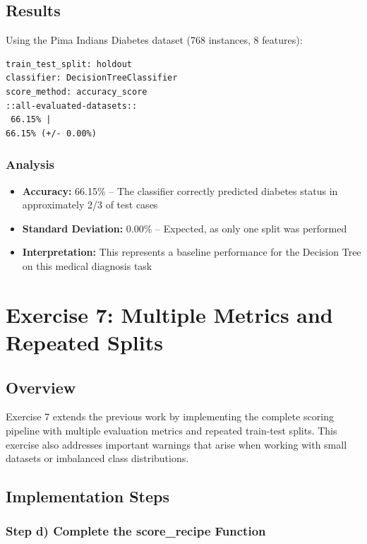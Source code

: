 \documentclass[12pt,a4paper]{article}
\begin{document}
\subsection{Results}

Using the Pima Indians Diabetes dataset (768 instances, 8 features):

\begin{verbatim}
train_test_split: holdout
classifier: DecisionTreeClassifier
score_method: accuracy_score
::all-evaluated-datasets::
 66.15% |
66.15% (+/- 0.00%)
\end{verbatim}

\subsubsection{Analysis}

\begin{itemize}
    \item \textbf{Accuracy:} 66.15\% -- The classifier correctly predicted diabetes status in approximately 2/3 of test cases
    \item \textbf{Standard Deviation:} 0.00\% -- Expected, as only one split was performed
    \item \textbf{Interpretation:} This represents a baseline performance for the Decision Tree on this medical diagnosis task
\end{itemize}

\section{Exercise 7: Multiple Metrics and Repeated Splits}

\subsection{Overview}

Exercise 7 extends the previous work by implementing the complete scoring pipeline with multiple evaluation metrics and repeated train-test splits. This exercise also addresses important warnings that arise when working with small datasets or imbalanced class distributions.

\subsection{Implementation Steps}

\subsubsection{Step d) Complete the score\_recipe Function}
\end{document}
